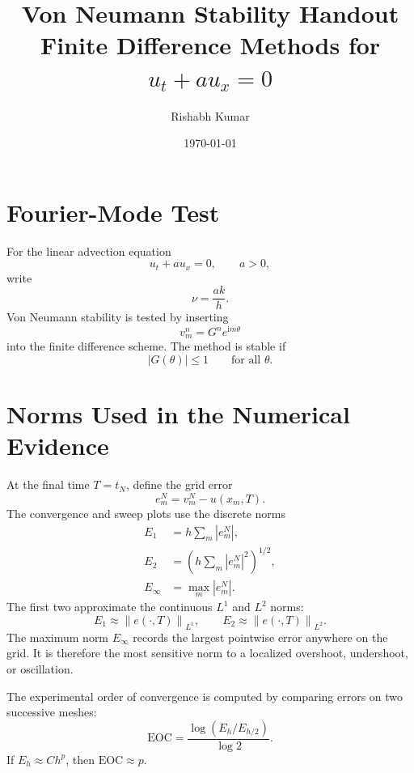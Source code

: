 \documentclass[11pt]{article}
\title{Von Neumann Stability Handout\\
Finite Difference Methods for $u_t+a u_x=0$}
\author{Rishabh Kumar}
\date{\today}
\newcommand{\ii}{\mathrm{i}}
\newcommand{\eoc}{\mathrm{EOC}}
\newcommand{\norm}[1]{\left\lVert #1\right\rVert}
\begin{document}
\maketitle

\section{Fourier-Mode Test}

For the linear advection equation
\begin{equation}
    u_t+a u_x=0,\qquad a>0,
\end{equation}
write
\begin{equation}
    \nu=\frac{ak}{h}.
\end{equation}
Von Neumann stability is tested by inserting
\begin{equation}
    v_m^n=G^n e^{\ii m\theta}
\end{equation}
into the finite difference scheme.  The method is stable if
\begin{equation}
    |G(\theta)|\le 1
    \qquad\text{for all }\theta.
\end{equation}

\section{Norms Used in the Numerical Evidence}

At the final time $T=t_N$, define the grid error
\begin{equation}
    e_m^N=v_m^N-u(x_m,T).
\end{equation}
The convergence and sweep plots use the discrete norms
\begin{align}
    E_1
    &=
    h\sum_m |e_m^N|,
    \\
    E_2
    &=
    \left(h\sum_m |e_m^N|^2\right)^{1/2},
    \\
    E_\infty
    &=
    \max_m |e_m^N|.
\end{align}
The first two approximate the continuous $L^1$ and $L^2$ norms:
\begin{equation}
    E_1\approx \norm{e(\cdot,T)}_{L^1},
    \qquad
    E_2\approx \norm{e(\cdot,T)}_{L^2}.
\end{equation}
The maximum norm $E_\infty$ records the largest pointwise error anywhere on the grid.
It is therefore the most sensitive norm to a localized overshoot, undershoot, or
oscillation.

The experimental order of convergence is computed by comparing errors on two
successive meshes:
\begin{equation}
    \eoc
    =
    \frac{\log(E_h/E_{h/2})}{\log 2}.
\end{equation}
If $E_h\approx C h^p$, then $\eoc\approx p$.
\end{document}
